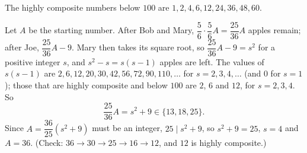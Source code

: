 The highly composite numbers below $100$ are $1,2,4,6,12,24,36,48,60$.

Let $A$ be the starting number. After Bob and Mary, $\dfrac56\cdot\dfrac56A=\dfrac{25}{36}A$ apples remain; after Joe, $\dfrac{25}{36}A-9$. Mary then takes its square root, so $\dfrac{25}{36}A-9=s^2$ for a positive integer $s$, and $s^2-s=s(s-1)$ apples are left. The values of $s(s-1)$ are $2,6,12,20,30,42,56,72,90,110,\dots$ for $s=2,3,4,\dots$ (and $0$ for $s=1$); those that are highly composite and below $100$ are $2$, $6$ and $12$, for $s=2,3,4$. So
\[\dfrac{25}{36}A=s^2+9\in\{13,18,25\}.\]
Since $A=\dfrac{36}{25}\left(s^2+9\right)$ must be an integer, $25\mid s^2+9$, so $s^2+9=25$, $s=4$ and $A=\boxed{36}$. (Check: $36\to30\to25\to16\to12$, and $12$ is highly composite.)
